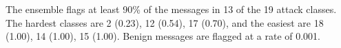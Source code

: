 The ensemble flags at least 90\% of the messages in 13 of the 19 attack classes. The hardest classes are 2 (0.23), 12 (0.54), 17 (0.70), and the easiest are 18 (1.00), 14 (1.00), 15 (1.00). Benign messages are flagged at a rate of 0.001.
